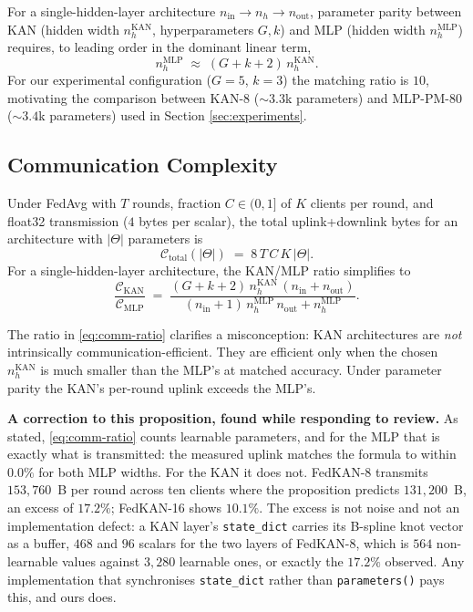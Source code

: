 \begin{corollary}\label{cor:match}
For a single-hidden-layer architecture $n_{\text{in}} \to n_h \to n_{\text{out}}$, parameter parity between KAN (hidden width $n_h^{\text{KAN}}$, hyperparameters $G, k$) and MLP (hidden width $n_h^{\text{MLP}}$) requires, to leading order in the dominant linear term,
\begin{equation}
n_h^{\text{MLP}} \;\approx\; (G + k + 2)\, n_h^{\text{KAN}}.
\end{equation}
For our experimental configuration ($G=5$, $k=3$) the matching ratio is $10$, motivating the comparison between KAN-8 ($\sim 3.3$k parameters) and MLP-PM-80 ($\sim 3.4$k parameters) used in Section \ref{sec:experiments}.
\end{corollary}

\subsection{Communication Complexity}

\begin{proposition}\label{prop:comm}
Under FedAvg with $T$ rounds, fraction $C \in (0, 1]$ of $K$ clients per round, and float32 transmission ($4$ bytes per scalar), the total uplink+downlink bytes for an architecture with $|\Theta|$ parameters is
\begin{equation}
\mathcal{C}_{\text{total}}(|\Theta|) \;=\; 8\, T\, C\, K\, |\Theta|.
\end{equation}
For a single-hidden-layer architecture, the KAN/MLP ratio simplifies to
\begin{equation}\label{eq:comm-ratio}
\frac{\mathcal{C}_{\text{KAN}}}{\mathcal{C}_{\text{MLP}}} \;=\; \frac{(G+k+2)\, n_h^{\text{KAN}}\,(n_{\text{in}}+n_{\text{out}})}{(n_{\text{in}}+1)\, n_h^{\text{MLP}}\, n_{\text{out}} + n_h^{\text{MLP}}}.
\end{equation}
\end{proposition}

\noindent The ratio in \eqref{eq:comm-ratio} clarifies a misconception: KAN architectures are
\emph{not} intrinsically communication-efficient. They are efficient only when the chosen
$n_h^{\text{KAN}}$ is much smaller than the MLP's at matched accuracy. Under parameter parity
the KAN's per-round uplink exceeds the MLP's.

\textbf{A correction to this proposition, found while responding to review.} As stated,
\eqref{eq:comm-ratio} counts learnable parameters, and for the MLP that is exactly what is
transmitted: the measured uplink matches the formula to within $0.0\%$ for both MLP widths.
For the KAN it does not. FedKAN-8 transmits $153{,}760$~B per round across ten clients where
the proposition predicts $131{,}200$~B, an excess of $17.2\%$; FedKAN-16 shows $10.1\%$. The
excess is not noise and not an implementation defect: a KAN layer's \texttt{state\_dict}
carries its B-spline knot vector as a buffer, $468$ and $96$ scalars for the two layers of
FedKAN-8, which is $564$ non-learnable values against $3{,}280$ learnable ones, or exactly the
$17.2\%$ observed. Any implementation that synchronises \texttt{state\_dict} rather than
\texttt{parameters()} pays this, and ours does.

